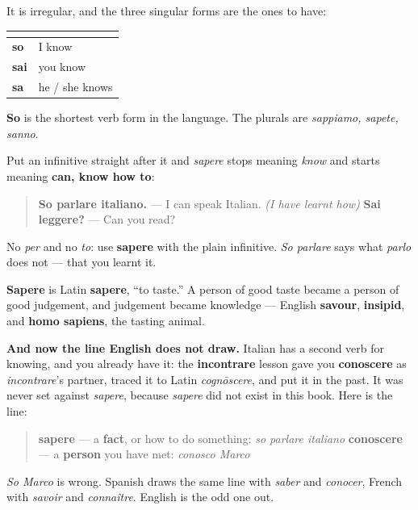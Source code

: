 It is irregular, and the three singular forms are the ones to have:

\noindent
\begin{tabularx}{\linewidth}{@{}>{\raggedright\arraybackslash}X>{\raggedright\arraybackslash}X@{}}
\toprule
\textbf{} & \textbf{} \\
\midrule
\textbf{so} & I know \\
\textbf{sai} & you know \\
\textbf{sa} & he / she knows \\
\bottomrule
\end{tabularx}

\textbf{So} is the shortest verb form in the language. The plurals are \emph{sappiamo, sapete, sanno}.

\begin{grammarlens}[title={Grammar lens: sapere plus an infinitive}]
Put an infinitive straight after it and \emph{sapere} stops meaning \emph{know} and starts meaning \textbf{can, know how to}:

\begin{quote}
\textbf{So parlare italiano.} — I can speak Italian. \emph{(I have learnt how)} \textbf{Sai leggere?} — Can you read?
\end{quote}

No \emph{per} and no \emph{to}: use \textbf{sapere} with the plain infinitive. \emph{So parlare} says what \emph{parlo} does not — that you learnt it.

\textbf{Sapere} is Latin \textbf{sapere}, \textquotedblleft{}to taste.\textquotedblright{} A person of good taste became a person of good judgement, and judgement became knowledge — English \textbf{savour}, \textbf{insipid}, and \textbf{homo sapiens}, the tasting animal.

\textbf{And now the line English does not draw.} Italian has a second verb for knowing, and you already have it: the \textbf{incontrare} lesson gave you \textbf{conoscere} as \emph{incontrare}'s partner, traced it to Latin \emph{cognōscere}, and put it in the past. It was never set against \emph{sapere}, because \emph{sapere} did not exist in this book. Here is the line:

\begin{quote}
\textbf{sapere} — a \textbf{fact}, or how to do something: \emph{so parlare italiano} \textbf{conoscere} — a \textbf{person} you have met: \emph{conosco Marco}
\end{quote}

\emph{So Marco} is wrong. Spanish draws the same line with \emph{saber} and \emph{conocer}, French with \emph{savoir} and \emph{connaître}. English is the odd one out.
\end{grammarlens}

